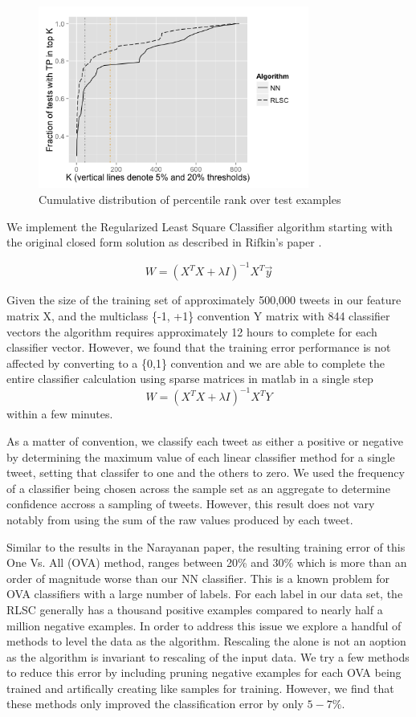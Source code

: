 \documentclass[10pt, conference, compsocconf]{IEEEtran}
\begin{document}
\begin{figure}[!t]
\centering
\includegraphics[width=3.5in]{resultcdf.png}
\caption{Cumulative distribution of percentile rank over test examples}
\label{fig_sim}
\end{figure}

We implement the Regularized Least Square Classifier algorithm starting with the original closed form solution as described in Rifkin's paper \cite{Rifkin}.  

$$W=(X^T X+\lambda I)^{-1} X^T \vec{y}$$


Given the size of the training set of approximately 500,000 tweets in our feature matrix X, and the multiclass \{-1, +1\} convention Y matrix with 844 classifier vectors the algorithm requires approximately 12 hours to complete for each classifier vector.  However, we found that the training error performance is not affected by converting to a \{0,1\} convention and we are able to complete the entire classifier calculation using sparse matrices in matlab in a single step $$W=(X^T X+\lambda I)^{-1} X^T Y$$ within a few minutes.

As a matter of convention, we classify each tweet as either a positive or negative by determining the maximum value of each linear classifier method for a single tweet, setting that classifer to one and the others to zero.  We used the frequency of a classifier being chosen across the sample set as an aggregate to determine confidence accross a sampling of tweets.  However, this result does not vary notably from using the sum of the raw values produced by each tweet.
  
Similar to the results in the Narayanan paper, the resulting training error of this One Vs. All (OVA) method, ranges between 20\% and 30\%  which is more than an order of magnitude worse than our NN classifier.  This is a known problem for OVA  classifiers with a large number of labels.  For each label in our data set, the RLSC generally has a thousand positive examples compared to nearly half a million negative examples. In order to address this issue we explore a handful of methods to level the data as the algorithm.  Rescaling the alone is not an aoption as the algorithm is invariant to rescaling of the input data.  We try a few methods \cite{Schapire} to reduce this error by including pruning \cite{Dekel} negative examples for each OVA being trained and artifically creating like samples for training.  However, we find that these methods only improved the classification error by only $5-7\%$.  
\end{document}
